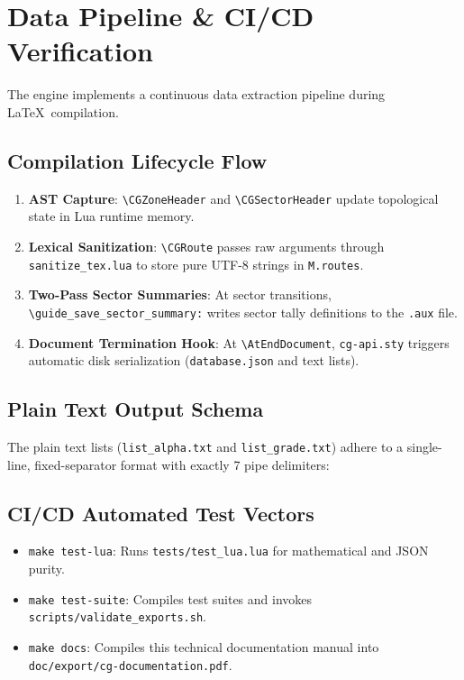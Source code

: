\clearpage
\section{Data Pipeline \& CI/CD Verification}

The engine implements a continuous data extraction pipeline during \LaTeX\ compilation.

\subsection{Compilation Lifecycle Flow}
\begin{sloppypar}
\begin{enumerate}
    \item \textbf{AST Capture}: \texttt{\textbackslash CGZoneHeader} and \texttt{\textbackslash CGSectorHeader} update topological state in Lua runtime memory.
    \item \textbf{Lexical Sanitization}: \texttt{\textbackslash CGRoute} passes raw arguments through \texttt{sanitize\_tex.lua} to store pure UTF-8 strings in \texttt{M.routes}.
    \item \textbf{Two-Pass Sector Summaries}: At sector transitions, \texttt{\textbackslash guide\_save\_sector\_summary:} writes sector tally definitions to the \texttt{.aux} file.
    \item \textbf{Document Termination Hook}: At \texttt{\textbackslash AtEndDocument}, \texttt{cg-api.sty} triggers automatic disk serialization (\texttt{database.json} and text lists).
\end{enumerate}
\end{sloppypar}

\subsection{Plain Text Output Schema}
The plain text lists (\texttt{list\_alpha.txt} and \texttt{list\_grade.txt}) adhere to a single-line, fixed-separator format with exactly 7 pipe delimiters:

\vspace{0.5em}
\noindent
\resizebox{\linewidth}{!}{\texttt{[ID] | [Name] | [Grade] | [Length] | [Gear] | [Setter] | [Sector] | [Zone]}}

\subsection{CI/CD Automated Test Vectors}
\begin{sloppypar}
\begin{itemize}
    \item \texttt{make test-lua}: Runs \texttt{tests/test\_lua.lua} for mathematical and JSON purity.
    \item \texttt{make test-suite}: Compiles test suites and invokes \mbox{\texttt{scripts/validate\_exports.sh}}.
    \item \texttt{make docs}: Compiles this technical documentation manual into \mbox{\texttt{doc/export/cg-documentation.pdf}}.
\end{itemize}
\end{sloppypar}
